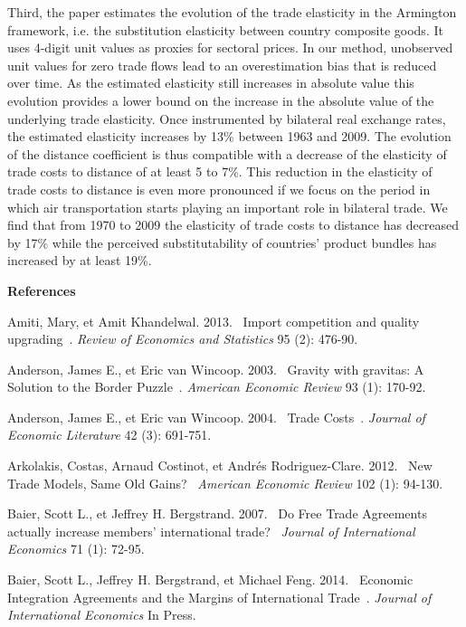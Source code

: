\documentclass[12pt,twoside,a4paper,notitlepage]{article}
\begin{document}
Third, the paper estimates the evolution of the trade elasticity in the Armington framework, i.e. the substitution elasticity between country composite goods. It uses 4-digit unit values as proxies for sectoral prices. In our method, unobserved unit values for zero trade flows lead to an overestimation bias that is reduced over time. As the estimated elasticity still increases in absolute value this%
 evolution provides a lower bound on the increase in the absolute value of the underlying trade elasticity. Once instrumented by bilateral real exchange rates, the estimated elasticity increases by 13\% between 1963 and 2009. The evolution of the distance coefficient is thus compatible with a decrease of the elasticity of trade costs to distance of at least 5 to 7\%. This reduction in the elasticity of trade costs to distance is even more pronounced if we focus on the period in which air transportation starts playing an important role in bilateral trade. We find that from 1970 to 2009 the elasticity of trade costs to distance has decreased by 17\% while the perceived substitutability of countries' product bundles has increased by at least 19\%.

\textbf{References}

Amiti, Mary, et Amit Khandelwal. 2013. {\flqq}~Import competition and quality upgrading~{\frqq}. \textit{Review of Economics and Statistics} 95 (2): 476\hbox{-}90.

Anderson, James E., et Eric van Wincoop. 2003. {\flqq}~Gravity with gravitas: A Solution to the Border Puzzle~{\frqq}. \textit{American Economic Review} 93 (1): 170\hbox{-}92.

Anderson, James E., et Eric van Wincoop. 2004. {\flqq}~Trade Costs~{\frqq}. \textit{Journal of Economic Literature} 42 (3): 691\hbox{-}751.

Arkolakis, Costas, Arnaud Costinot, et Andr\'{e}s Rodriguez-Clare. 2012. {\flqq}~New Trade Models, Same Old Gains?~{\frqq} \textit{American Economic Review} 102 (1): 94\hbox{-}130.

Baier, Scott L., et Jeffrey H. Bergstrand. 2007. {\flqq}~Do Free Trade Agreements actually increase members' international trade?~{\frqq} \textit{Journal of International Economics} 71 (1): 72\hbox{-}95.

Baier, Scott L., Jeffrey H. Bergstrand, et Michael Feng. 2014. {\flqq}~Economic Integration Agreements and the Margins of International Trade~{\frqq}. \textit{Journal of International Economics} In Press.
\end{document}
